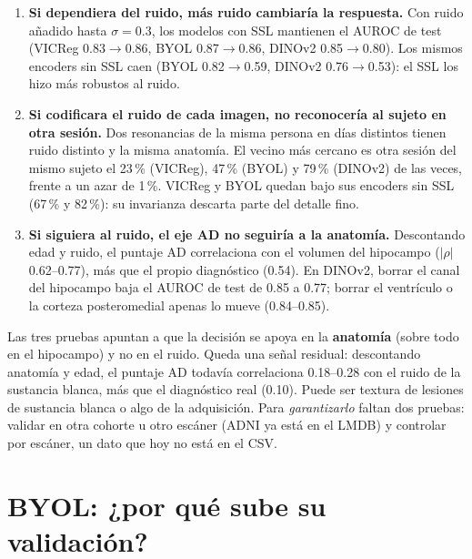 \documentclass[11pt,a4paper]{article}
\begin{document}
\begin{enumerate}[leftmargin=16pt]
\item \textbf{Si dependiera del ruido, más ruido cambiaría la respuesta.} Con ruido añadido
  hasta $\sigma=0.3$, los modelos con SSL mantienen el AUROC de test (VICReg 0.83$\rightarrow$0.86,
  BYOL 0.87$\rightarrow$0.86, DINOv2 0.85$\rightarrow$0.80). Los mismos encoders sin SSL caen
  (BYOL 0.82$\rightarrow$0.59, DINOv2 0.76$\rightarrow$0.53): el SSL los hizo más robustos al
  ruido.
\item \textbf{Si codificara el ruido de cada imagen, no reconocería al sujeto en otra
  sesión.} Dos resonancias de la misma persona en días distintos tienen ruido distinto y la
  misma anatomía. El vecino más cercano es otra sesión del mismo sujeto el 23\,\% (VICReg), 47\,\%
  (BYOL) y 79\,\% (DINOv2) de las veces, frente a un azar de 1\,\%. VICReg y BYOL quedan bajo sus
  encoders sin SSL (67\,\% y 82\,\%): su invarianza descarta parte del detalle fino.
\item \textbf{Si siguiera al ruido, el eje AD no seguiría a la anatomía.} Descontando edad y
  ruido, el puntaje AD correlaciona con el volumen del hipocampo ($|\rho|$ 0.62--0.77), más que el
  propio diagnóstico (0.54). En DINOv2, borrar el canal del hipocampo baja el AUROC de test de
  0.85 a 0.77; borrar el ventrículo o la corteza posteromedial apenas lo mueve (0.84--0.85).
\end{enumerate}

\begin{ideabox}
Las tres pruebas apuntan a que la decisión se apoya en la \textbf{anatomía} (sobre todo en el
hipocampo) y no en el ruido. Queda una señal residual: descontando anatomía y edad, el puntaje AD
todavía correlaciona 0.18--0.28 con el ruido de la sustancia blanca, más que el diagnóstico real
(0.10). Puede ser textura de lesiones de sustancia blanca o algo de la adquisición. Para
\emph{garantizarlo} faltan dos pruebas: validar en otra cohorte u otro escáner (ADNI ya está en
el LMDB) y controlar por escáner, un dato que hoy no está en el CSV.
\end{ideabox}

\section{BYOL: ¿por qué sube su validación?}
\label{sec:byol}
\end{document}
